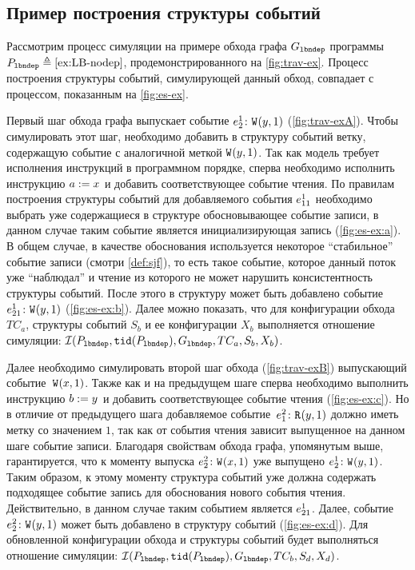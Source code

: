 
\subsection{Пример построения структуры событий}

Рассмотрим процесс симуляции на примере
обхода графа $G_{\mathtt{lbndep}}$ программы $P_{\mathtt{lbndep}} \triangleq \text{\ref{ex:LB-nodep}}$,
продемонстрированного на \cref{fig:trav-ex}.
Процесс построения структуры событий,
симулирующей данный обход, совпадает с процессом,
показанным на \cref{fig:es-ex}.



Первый шаг обхода графа выпускает событие
$e^{1}_{2}\colon {{\mathtt{W}}}^{}({y},{1}){}$ (\cref{fig:trav-exA}).
Чтобы симулировать этот шаг, необходимо добавить
в структуру событий ветку, содержащую событие
с аналогичной меткой ${{\mathtt{W}}}^{}({y},{1}){}$.
Так как модель \Wkm требует исполнения инструкций
в программном порядке, сперва необходимо исполнить  
инструкцию $a \;{:=}\;{x}^{}$ и добавить соответствующее событие чтения.
По правилам построения структуры событий \Wkm
для добавляемого события $e^{1}_{11}$ необходимо
выбрать уже содержащиеся в структуре обосновывающее событие записи,
в данном случае таким событие является
инициализирующая запись (\cref{fig:es-ex:a}).
В общем случае, в качестве обоснования используется
некоторое ``стабильное'' событие записи (смотри \cref{def:sjf}),
то есть такое событие, которое данный поток уже ``наблюдал''
и чтение из которого не может нарушить консистентность структуры событий.
После этого в структуру может быть добавлено событие
$e^{1}_{21}\colon {{\mathtt{W}}}^{}({y},{1})$ (\cref{fig:es-ex:b}).
Далее можно показать, что для конфигурации обхода $TC_a$,
структуры событий $S_b$ и ее конфигурации $X_b$
выполняется отношение симуляции:
$\mathcal{I}(P_{\mathtt{lbndep}}, {\mathtt{tid}}(P_{\mathtt{lbndep}}), G_{\mathtt{lbndep}}, TC_a, S_b, X_b)$.

Далее необходимо симулировать второй шаг обхода
(\cref{fig:trav-exB}) выпускающий событие~${{\mathtt{W}}}^{}({x},{1})$.
Также как и на предыдущем шаге сперва необходимо
выполнить инструкцию $b \;{:=}\;{y}^{}$ и добавить соответствующее
событие чтения (\cref{fig:es-ex:c}). Но в отличие от предыдущего шага
добавляемое событие~$e^{2}_{1}\colon {{\mathtt{R}}}^{}({y},{1})$ должно иметь
метку со значением $1$, так как от события чтения
зависит выпущенное на данном шаге событие записи.
Благодаря свойствам обхода графа, упомянутым выше,
гарантируется, что к моменту выпуска $e^{2}_{2}\colon {{\mathtt{W}}}^{}({x},{1}){}$
уже выпущено $e^{1}_{2}\colon {{\mathtt{W}}}^{}({y},{1})$.
Таким образом, к этому моменту структура событий уже должна
содержать подходящее событие запись для обоснования нового события чтения.
Действительно, в данном случае таким событием является $e^{1}_{21}$.
Далее, событие $e^{2}_{2}\colon {{\mathtt{W}}}^{}({y},{1}){}$ может быть добавлено
в структуру событий (\cref{fig:es-ex:d}).
Для обновленной конфигурации обхода и структуры событий
будет выполняться отношение симуляции:
$\mathcal{I}(P_{\mathtt{lbndep}}, {\mathtt{tid}}(P_{\mathtt{lbndep}}), G_{\mathtt{lbndep}}, TC_b, S_d, X_d)$.

